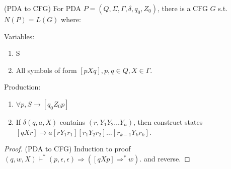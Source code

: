         \begin{theorem}
            (PDA to CFG) For PDA $P=(Q,\Sigma,\Gamma,\delta,q_0,Z_0)$, there is a CFG $G$ s.t. $N(P)=L(G)$ where:

            Variables:
            \begin{enumerate}
                \item S
                \item All symbols of form $[pXq],p,q\in Q,X\in \Gamma$.
            \end{enumerate}
            Production:
            \begin{enumerate}
                \item $\forall p,S\rightarrow [q_0Z_0p]$ 
                \item If $\delta(q,a,X)$ contains $(r,Y_1Y_2\ldots Y_{n})$, then construct states $[qXr]\rightarrow a[rY_1r_1][r_1Y_2r_2]\ldots[r_{k-1}Y_{k}r_{k}]$.
            \end{enumerate}
        \end{theorem}
        \begin{proof}
            \label{theorem:PDA to CFG}
            (PDA to CFG) Induction to proof $(q,w,X)\vdash ^{*}(p,\epsilon,\epsilon)\Rightarrow ([qXp]\Rightarrow ^{*}w)$. and reverse.
        \end{proof}
